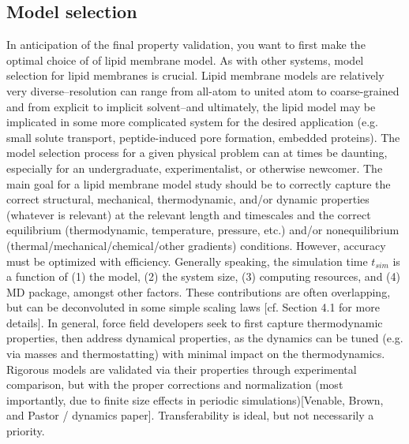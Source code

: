 \documentclass[9pt,bestpractices]{livecoms}
\begin{document}
\subsection{Model selection}
In anticipation of the final property validation, you want to first make the optimal choice of of lipid membrane model.
As with other systems, model selection for lipid membranes is crucial.
Lipid membrane models are relatively very diverse--resolution can range from all-atom to united atom to coarse-grained and from explicit to implicit solvent--and ultimately, the lipid model may be implicated in some more complicated system for the desired application (e.g. small solute transport, peptide-induced pore formation, embedded proteins).
The model selection process for a given physical problem can at times be daunting, especially for an undergraduate, experimentalist, or otherwise newcomer.
The main goal for a lipid membrane model study should be to correctly capture the correct structural, mechanical, thermodynamic, and/or dynamic properties (whatever is relevant) at the relevant length and timescales and the correct equilibrium (thermodynamic, temperature, pressure, etc.) and/or nonequilibrium (thermal/mechanical/chemical/other gradients) conditions.
However, accuracy must be optimized with efficiency.
Generally speaking, the simulation time $t_{sim}$ is a function of (1) the model, (2) the system size, (3) computing resources, and (4) MD package, amongst other factors.
These contributions are often overlapping, but can be deconvoluted in some simple scaling laws [cf. Section 4.1 for more details].
In general, force field developers seek to first capture thermodynamic properties, then address dynamical properties, as the dynamics can be tuned (e.g. via masses and thermostatting) with minimal impact on the thermodynamics.
Rigorous models are validated via their properties through experimental comparison, but with the proper corrections and normalization (most importantly, due to finite size effects in periodic simulations)[Venable, Brown, and Pastor / dynamics paper].
Transferability is ideal, but not necessarily a priority.
\end{document}
